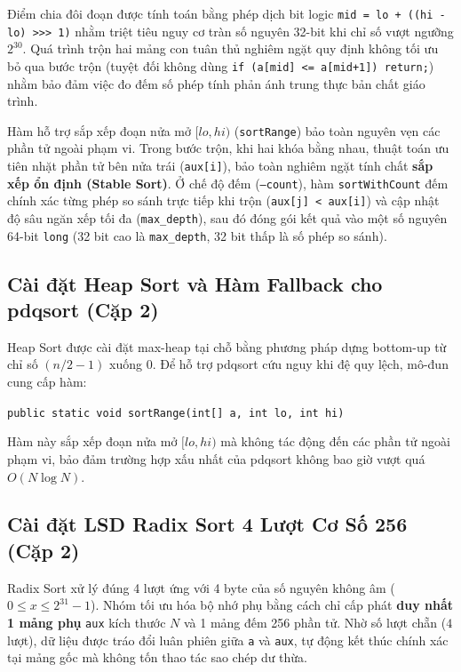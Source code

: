 \documentclass[conference]{IEEEtran}
\begin{document}
Điểm chia đôi đoạn được tính toán bằng phép dịch bit logic \texttt{mid = lo + ((hi - lo) >>> 1)} nhằm triệt tiêu nguy cơ tràn số nguyên 32-bit khi chỉ số vượt ngưỡng $2^{30}$. Quá trình trộn hai mảng con tuân thủ nghiêm ngặt quy định không tối ưu bỏ qua bước trộn (tuyệt đối không dùng \texttt{if (a[mid] <= a[mid+1]) return;}) nhằm bảo đảm việc đo đếm số phép tính phản ánh trung thực bản chất giáo trình.

Hàm hỗ trợ sắp xếp đoạn nửa mở $[lo, hi)$ (\texttt{sortRange}) bảo toàn nguyên vẹn các phần tử ngoài phạm vi. Trong bước trộn, khi hai khóa bằng nhau, thuật toán ưu tiên nhặt phần tử bên nửa trái (\texttt{aux[i]}), bảo toàn nghiêm ngặt tính chất \textbf{sắp xếp ổn định (Stable Sort)}. Ở chế độ đếm (\texttt{--count}), hàm \texttt{sortWithCount} đếm chính xác từng phép so sánh trực tiếp khi trộn (\texttt{aux[j] < aux[i]}) và cập nhật độ sâu ngăn xếp tối đa (\texttt{max\_depth}), sau đó đóng gói kết quả vào một số nguyên 64-bit \texttt{long} (32 bit cao là \texttt{max\_depth}, 32 bit thấp là số phép so sánh).

\subsection{Cài đặt Heap Sort và Hàm Fallback cho pdqsort (Cặp 2)}
Heap Sort được cài đặt max-heap tại chỗ bằng phương pháp dựng bottom-up từ chỉ số $(n/2 - 1)$ xuống $0$. Để hỗ trợ pdqsort cứu nguy khi đệ quy lệch, mô-đun cung cấp hàm:
\begin{center}
\texttt{public static void sortRange(int[] a, int lo, int hi)}
\end{center}
Hàm này sắp xếp đoạn nửa mở $[lo, hi)$ mà không tác động đến các phần tử ngoài phạm vi, bảo đảm trường hợp xấu nhất của pdqsort không bao giờ vượt quá $O(N \log N)$.

\subsection{Cài đặt LSD Radix Sort 4 Lượt Cơ Số 256 (Cặp 2)}
Radix Sort xử lý đúng 4 lượt ứng với 4 byte của số nguyên không âm ($0 \le x \le 2^{31}-1$). Nhóm tối ưu hóa bộ nhớ phụ bằng cách chỉ cấp phát \textbf{duy nhất 1 mảng phụ} \texttt{aux} kích thước $N$ và 1 mảng đếm 256 phần tử. Nhờ số lượt chẵn ($4$ lượt), dữ liệu được tráo đổi luân phiên giữa \texttt{a} và \texttt{aux}, tự động kết thúc chính xác tại mảng gốc mà không tốn thao tác sao chép dư thừa.
\end{document}
